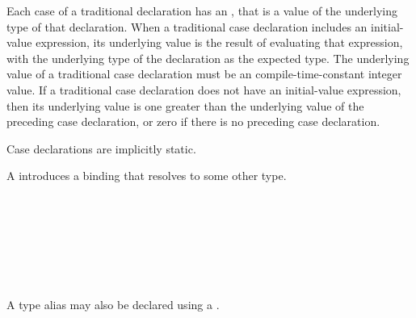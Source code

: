 Each case of a traditional  declaration has an , that is a value of the underlying type of that  declaration.
When a traditional case declaration includes an initial-value expression, its underlying value is the result of evaluating that expression, with the underlying type of the  declaration as the expected type.
The underlying value of a traditional case declaration must be an compile-time-constant integer value.
If a traditional case declaration does not have an initial-value expression, then its underlying value is one greater than the underlying value of the preceding case declaration, or zero if there is no preceding case declaration.

Case declarations are implicitly static.

%
%
%
%
%


A  introduces a binding that resolves to some other type.

\begin{Syntax}
     \\
        \SynOr {}

     \\
          \\
        \SynOpt \\
        \SynOpt \\
        \code{=}  \code{;}
\end{Syntax}

\begin{Legacy}


A type alias may also be declared using a .

\begin{Syntax}
     \\
           \code{;}
        \SynOr {}
\end{Syntax}

\end{Legacy}

